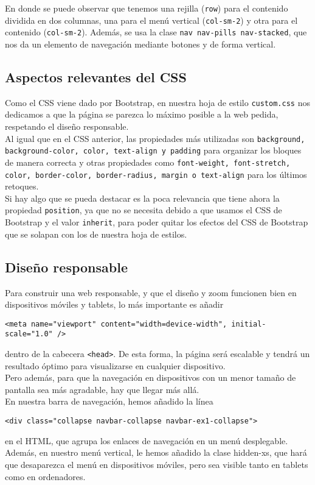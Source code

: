 \documentclass[10pt,a4paper]{article}
\begin{document}
En donde se puede observar que tenemos una rejilla (\texttt{row}) para el contenido dividida en dos columnas, una para el menú vertical (\texttt{col-sm-2}) y otra para el contenido (\texttt{col-sm-2}).
Además, se usa la clase \texttt{nav nav-pills nav-stacked}, que nos da un elemento de navegación mediante botones y de forma vertical.


\subsection{Aspectos relevantes del CSS}
Como el CSS viene dado por Bootstrap, en nuestra hoja de estilo \texttt{custom.css} nos dedicamos a que la página se parezca lo máximo posible a la web pedida, respetando el diseño responsable.\\

Al igual que en el CSS anterior, las propiedades más utilizadas son \texttt{background, background-color, color, text-align y padding} para organizar los bloques de manera correcta y otras propiedades como \texttt{font-weight, font-stretch, color, border-color, border-radius, margin o text-align} para los últimos retoques.\\

Si hay algo que se pueda destacar es la poca relevancia que tiene ahora la propiedad \texttt{position}, ya que no se necesita debido a que usamos el CSS de Bootstrap y el valor \texttt{inherit}, para poder quitar los efectos del CSS de Bootstrap que se solapan con los de nuestra hoja de estilos.

\subsection{Diseño responsable}

Para construir una web responsable, y que el diseño y zoom funcionen bien en dispositivos móviles y tablets, lo más importante es añadir  \begin{verbatim}
<meta name="viewport" content="width=device-width", initial-scale="1.0" />
\end{verbatim} dentro de la cabecera \texttt{<head>}.
De esta forma, la página será escalable y tendrá un resultado óptimo para visualizarse en cualquier dispositivo.\\

Pero además, para que la navegación en dispositivos con un menor tamaño de pantalla sea más agradable, hay que llegar más allá.\\

En nuestra barra de navegación, hemos añadido la línea 
\begin{verbatim}
<div class="collapse navbar-collapse navbar-ex1-collapse">
\end{verbatim} 
en el HTML, que agrupa los enlaces de navegación en un menú desplegable.\\

Además, en nuestro menú vertical, le hemos añadido la clase hidden-xs, que hará que desaparezca el menú en dispositivos móviles, pero sea visible tanto en tablets como en ordenadores.
\end{document}

